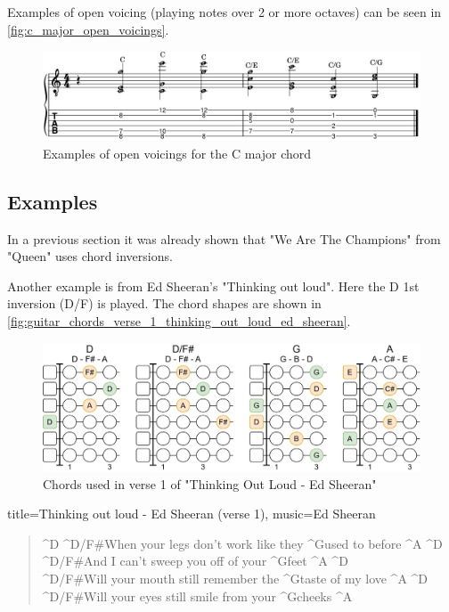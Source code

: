 Examples of open voicing (playing notes over 2 or more octaves) can be seen in \autoref{fig:c_major_open_voicings}.

\begin{figure}[h]
	\centering
	\includegraphics[height=0.13\textheight]{../../MuseScore/Guitar/CMajorOpenVoicings.png}
	\caption{Examples of open voicings for the C major chord}
	\label{fig:c_major_open_voicings}
\end{figure}

\newpage

\subsection{Examples}

In a previous section it was already shown that "We Are The Champions" from "Queen" uses chord inversions.

Another example is from Ed Sheeran's "Thinking out loud". Here the D 1st inversion (D/F\sharp) is played. The chord shapes are shown in \autoref{fig:guitar_chords_verse_1_thinking_out_loud_ed_sheeran}.

\begin{figure}[h]
	\centering
	\includegraphics[height=0.16\textheight]{../../Images/EdSheeranThinkingOutLoudVerseChords.png}
	\caption{Chords used in verse 1 of "Thinking Out Loud - Ed Sheeran"}
	\label{fig:guitar_chords_verse_1_thinking_out_loud_ed_sheeran}
\end{figure}


\begin{song}[verse/numbered, align-chords=l]{title={Thinking out loud - Ed Sheeran (verse 1)}, music={Ed Sheeran}}
	\begin{verse}
		^{D} ^{D/F#}When your legs don't work like they ^{G}used to before ^{A} ^{D} \\
		^{D/F#}And I can't sweep you off of your ^{G}feet ^{A} ^{D} \\
		^{D/F#}Will your mouth still remember the ^{G}taste of my love ^{A} ^{D} \\
		^{D/F#}Will your eyes still smile from your ^{G}cheeks ^{A} \\
	\end{verse}
\end{song}

